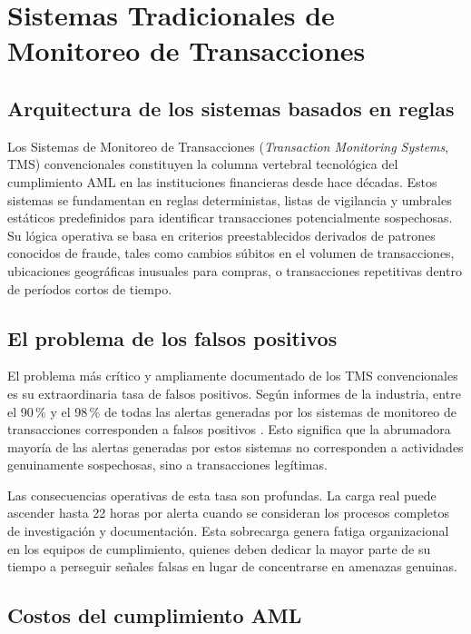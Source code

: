 

\section{Sistemas Tradicionales de Monitoreo de Transacciones}

\subsection{Arquitectura de los sistemas basados en reglas}

Los Sistemas de Monitoreo de Transacciones (\textit{Transaction Monitoring Systems}, TMS) convencionales constituyen la columna vertebral tecnológica del cumplimiento AML en las instituciones financieras desde hace décadas. Estos sistemas se fundamentan en reglas deterministas, listas de vigilancia y umbrales estáticos predefinidos para identificar transacciones potencialmente sospechosas. Su lógica operativa se basa en criterios preestablecidos derivados de patrones conocidos de fraude, tales como cambios súbitos en el volumen de transacciones, ubicaciones geográficas inusuales para compras, o transacciones repetitivas dentro de períodos cortos de tiempo.

\subsection{El problema de los falsos positivos}

El problema más crítico y ampliamente documentado de los TMS convencionales es su extraordinaria tasa de falsos positivos. Según informes de la industria, entre el 90\,\% y el 98\,\% de todas las alertas generadas por los sistemas de monitoreo de transacciones corresponden a falsos positivos \cite{ForresterConsulting2023True2023}. Esto significa que la abrumadora mayoría de las alertas generadas por estos sistemas no corresponden a actividades genuinamente sospechosas, sino a transacciones legítimas.

Las consecuencias operativas de esta tasa son profundas. La carga real puede ascender hasta 22 horas por alerta cuando se consideran los procesos completos de investigación y documentación. Esta sobrecarga genera fatiga organizacional en los equipos de cumplimiento, quienes deben dedicar la mayor parte de su tiempo a perseguir señales falsas en lugar de concentrarse en amenazas genuinas.

\subsection{Costos del cumplimiento AML}

